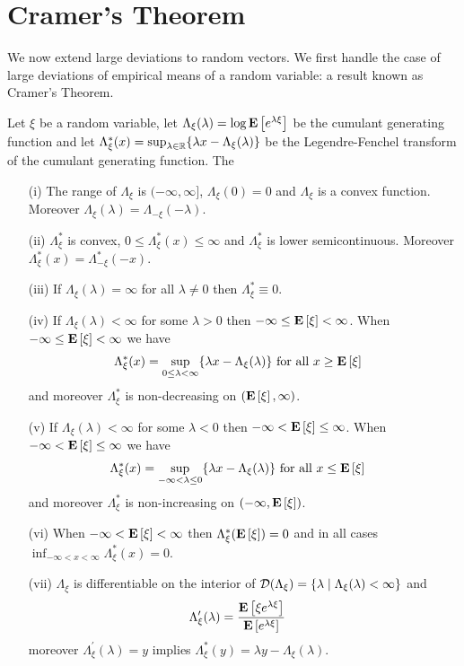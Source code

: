\section{Cramer's Theorem}
We now extend large deviations to random vectors.  We first handle the case of large deviations of empirical means of a random variable: a result known as Cramer's Theorem.

\begin{lem}\label{CumulantGeneratingFunctionReals}Let $\xi$ be a random variable, let $\Lambda_\xi(\lambda) = \log \textbf{E}\left[e^{\lambda \xi}\right]$ be the cumulant generating function and let $\Lambda_\xi^*(x) = \sup_{\lambda \in \mathbb{R}} \lbrace \lambda x - \Lambda_\xi(\lambda) \rbrace$ be the Legendre-Fenchel transform of the cumulant generating function.  The
\begin{itemize}
\item[(i)] The range of $\Lambda_\xi$ is $(-\infty, \infty]$, $\Lambda_\xi(0) = 0$ and $\Lambda_\xi$ is a convex function.  Moreover $\Lambda_\xi(\lambda) = \Lambda_{-\xi}(-\lambda)$.
\item[(ii)] $\Lambda_\xi^*$ is convex, $0 \leq \Lambda_\xi^*(x) \leq \infty$ and $\Lambda_\xi^*$ is lower semicontinuous.  Moreover $\Lambda_\xi^*(x) = \Lambda_{-\xi}^*(-x)$.
\item[(iii)] If $\Lambda_\xi(\lambda) = \infty$ for all $\lambda \neq 0$ then $\Lambda_\xi^* \equiv 0$.
\item[(iv)] If $\Lambda_\xi(\lambda) < \infty$ for some $\lambda > 0$ then $-\infty \leq \textbf{E}\left[\xi\right] < \infty$.  When $-\infty \leq \textbf{E}\left[\xi\right] < \infty$ we have
\begin{align*}
\Lambda_\xi^*(x) &= \sup_{0 \leq \lambda < \infty} \lbrace \lambda x - \Lambda_\xi(\lambda) \rbrace \text{ for all $x \geq \textbf{E}\left[\xi\right]$}
\end{align*}
and moreover $\Lambda_\xi^*$ is non-decreasing on $(\textbf{E}\left[\xi\right], \infty)$.
\item[(v)] If $\Lambda_\xi(\lambda) < \infty$ for some $\lambda < 0$ then $-\infty < \textbf{E}\left[\xi\right] \leq \infty$.  When $-\infty < \textbf{E}\left[\xi\right] \leq \infty$ we have
\begin{align*}
\Lambda_\xi^*(x) &= \sup_{-\infty < \lambda \leq 0} \lbrace \lambda x - \Lambda_\xi(\lambda) \rbrace \text{ for all $x \leq \textbf{E}\left[\xi\right]$}
\end{align*}
and moreover $\Lambda_\xi^*$ is non-increasing on $(-\infty, \textbf{E}\left[\xi\right])$.
\item[(vi)] When $-\infty < \textbf{E}\left[\xi\right] < \infty$ then $\Lambda_\xi^*(\textbf{E}\left[\xi\right]) = 0$ and in all cases $\inf_{-\infty < x < \infty} \Lambda_\xi^*(x) = 0$.
\item[(vii)]$\Lambda_\xi$ is differentiable on the interior of $\mathcal{D}(\Lambda_\xi) = \lbrace \lambda \mid \Lambda_\xi(\lambda) < \infty \rbrace$ and
\begin{align*}
\Lambda_\xi^\prime(\lambda) &= \frac{\textbf{E}\left[\xi e^{\lambda \xi}\right]} {\textbf{E}\left[e^{\lambda \xi}\right]}
\end{align*}
moreover $\Lambda_\xi^\prime(\lambda) = y$ implies $\Lambda_\xi^*(y) = \lambda y - \Lambda_\xi(\lambda)$.
\end{itemize}
\end{lem}
